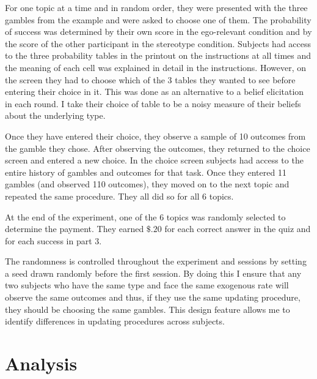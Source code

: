 \documentclass[
  12pt,
]{article}
\begin{document}
For one topic at a time and in random order, they were presented with
the three gambles from the example and were asked to choose one of them.
The probability of success was determined by their own score in the
ego-relevant condition and by the score of the other participant in the
stereotype condition. Subjects had access to the three probability
tables in the printout on the instructions at all times and the meaning
of each cell was explained in detail in the instructions. However, on
the screen they had to choose which of the 3 tables they wanted to see
before entering their choice in it. This was done as an alternative to a
belief elicitation in each round. I take their choice of table to be a
noisy measure of their beliefs about the underlying type.

Once they have entered their choice, they observe a sample of 10
outcomes from the gamble they chose. After observing the outcomes, they
returned to the choice screen and entered a new choice. In the choice
screen subjects had access to the entire history of gambles and outcomes
for that task. Once they entered 11 gambles (and observed 110 outcomes),
they moved on to the next topic and repeated the same procedure. They
all did so for all 6 topics.

At the end of the experiment, one of the 6 topics was randomly selected
to determine the payment. They earned \(\$.20\) for each correct answer
in the quiz and for each success in part 3.

The randomness is controlled throughout the experiment and sessions by
setting a seed drawn randomly before the first session. By doing this I
ensure that any two subjects who have the same type and face the same
exogenous rate will observe the same outcomes and thus, if they use the
same updating procedure, they should be choosing the same gambles. This
design feature allows me to identify differences in updating procedures
across subjects.

\hypertarget{analysis}{%
\section{Analysis}\label{analysis}}

\renewcommand\refname{Conclusion}
  
\end{document}
